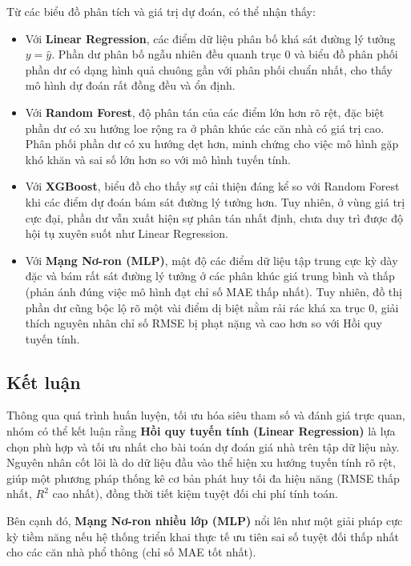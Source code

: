 Từ các biểu đồ phân tích và giá trị dự đoán, có thể nhận thấy:

\begin{itemize}
	\item Với \textbf{Linear Regression}, các điểm dữ liệu phân bố khá sát đường lý tưởng $y = \hat{y}$. Phần dư phân bố ngẫu nhiên đều quanh trục 0 và biểu đồ phân phối phần dư có dạng hình quả chuông gần với phân phối chuẩn nhất, cho thấy mô hình dự đoán rất đồng đều và ổn định.
	
	\item Với \textbf{Random Forest}, độ phân tán của các điểm lớn hơn rõ rệt, đặc biệt phần dư có xu hướng loe rộng ra ở phân khúc các căn nhà có giá trị cao. Phân phối phần dư có xu hướng dẹt hơn, minh chứng cho việc mô hình gặp khó khăn và sai số lớn hơn so với mô hình tuyến tính.
	
	\item Với \textbf{XGBoost}, biểu đồ cho thấy sự cải thiện đáng kể so với Random Forest khi các điểm dự đoán bám sát đường lý tưởng hơn. Tuy nhiên, ở vùng giá trị cực đại, phần dư vẫn xuất hiện sự phân tán nhất định, chưa duy trì được độ hội tụ xuyên suốt như Linear Regression.
	
	\item Với \textbf{Mạng Nơ-ron (MLP)}, mật độ các điểm dữ liệu tập trung cực kỳ dày đặc và bám rất sát đường lý tưởng ở các phân khúc giá trung bình và thấp (phản ánh đúng việc mô hình đạt chỉ số MAE thấp nhất). Tuy nhiên, đồ thị phần dư cũng bộc lộ rõ một vài điểm dị biệt nằm rải rác khá xa trục 0, giải thích nguyên nhân chỉ số RMSE bị phạt nặng và cao hơn so với Hồi quy tuyến tính.
\end{itemize}

\subsection{Kết luận}

Thông qua quá trình huấn luyện, tối ưu hóa siêu tham số và đánh giá trực quan, nhóm có thể kết luận rằng \textbf{Hồi quy tuyến tính (Linear Regression)} là lựa chọn phù hợp và tối ưu nhất cho bài toán dự đoán giá nhà trên tập dữ liệu này. Nguyên nhân cốt lõi là do dữ liệu đầu vào thể hiện xu hướng tuyến tính rõ rệt, giúp một phương pháp thống kê cơ bản phát huy tối đa hiệu năng (RMSE thấp nhất, $R^2$ cao nhất), đồng thời tiết kiệm tuyệt đối chi phí tính toán.

Bên cạnh đó, \textbf{Mạng Nơ-ron nhiều lớp (MLP)} nổi lên như một giải pháp cực kỳ tiềm năng nếu hệ thống triển khai thực tế ưu tiên sai số tuyệt đối thấp nhất cho các căn nhà phổ thông (chỉ số MAE tốt nhất).

